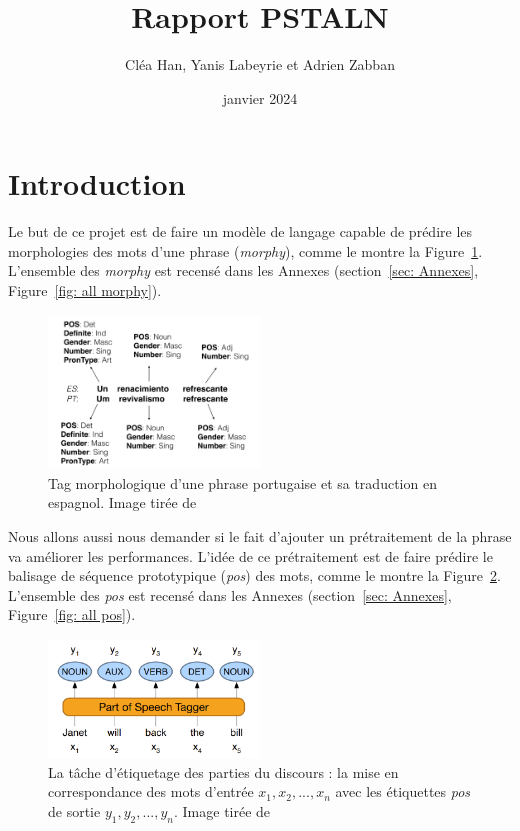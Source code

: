 \documentclass[a4paper]{article}
\title{Rapport PSTALN}
\author{Cléa Han, Yanis Labeyrie et Adrien Zabban}
\date{janvier 2024}
\begin{document}
\maketitle
\bigskip
\tableofcontents
\newpage

\section{Introduction}

Le but de ce projet est de faire un modèle de langage capable de prédire les morphologies des mots d'une phrase
(\textit{morphy}), comme le montre la Figure~\ref{fig: example morphy}. L'ensemble des \textit{morphy} 
est recensé dans les Annexes (section~\ref{sec: Annexes}, Figure~\ref{fig: all morphy}).

\begin{figure}[H]
    \centering
    \includegraphics[width=0.5\textwidth]{morphy.png}
    \caption{Tag morphologique d'une phrase portugaise et sa traduction en espagnol.
    Image tirée de~\cite{malaviya-etal-2018-neural}}
    \label{fig: example morphy}
\end{figure}    

Nous allons aussi nous demander si le fait d'ajouter un prétraitement de la phrase va améliorer
les performances. L'idée de ce prétraitement est de faire prédire le balisage de séquence
prototypique (\textit{pos}) des mots, comme le montre la Figure~\ref{fig: example pos}. L'ensemble des \textit{pos} 
est recensé dans les Annexes (section~\ref{sec: Annexes}, Figure~\ref{fig: all pos}).

\begin{figure}[H]
    \centering
    \includegraphics[width=0.5\textwidth]{pos.png}
    \caption{La tâche d'étiquetage des parties du discours : la mise en correspondance des mots d'entrée 
    $x_1, x_2,..., x_n$ avec les étiquettes \textit{pos} de sortie $y_1, y_2,..., y_n$.
    Image tirée de~\cite{pos}}
    \label{fig: example pos}
\end{figure} 
\end{document}
